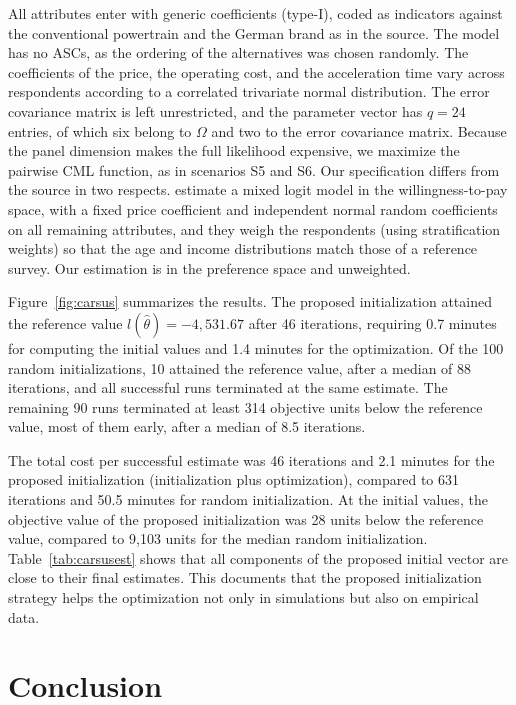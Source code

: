 \documentclass[preprint,12pt,authoryear]{elsarticle}
\begin{document}
All attributes enter with generic coefficients (type-I), coded as indicators against the conventional powertrain and the German brand as in the source. The model has no ASCs, as the ordering of the alternatives was chosen randomly. The coefficients of the price, the operating cost, and the acceleration time vary across respondents according to a correlated trivariate normal distribution. The error covariance matrix is left unrestricted, and the parameter vector has $q = 24$ entries, of which six belong to $\Omega$ and two to the error covariance matrix. Because the panel dimension makes the full likelihood expensive, we maximize the pairwise CML function, as in scenarios S5 and S6. Our specification differs from the source in two respects. \citet{Helveston2015} estimate a mixed logit model in the willingness-to-pay space, with a fixed price coefficient and independent normal random coefficients on all remaining attributes, and they weigh the respondents (using stratification weights) so that the age and income distributions match those of a reference survey. Our estimation is in the preference space and unweighted.

Figure~\ref{fig:carsus} summarizes the results. The proposed initialization attained the reference value $l(\hat{\theta}) = -4{,}531.67$ after 46 iterations, requiring 0.7 minutes for computing the initial values and 1.4 minutes for the optimization. Of the 100 random initializations, 10 attained the reference value, after a median of 88 iterations, and all successful runs terminated at the same estimate. The remaining 90 runs terminated at least 314 objective units below the reference value, most of them early, after a median of 8.5 iterations.

The total cost per successful estimate was 46 iterations and 2.1 minutes for the proposed initialization (initialization plus optimization), compared to 631 iterations and 50.5 minutes for random initialization. At the initial values, the objective value of the proposed initialization was 28 units below the reference value, compared to 9{,}103 units for the median random initialization. Table~\ref{tab:carsusest} shows that all components of the proposed initial vector are close to their final estimates. This documents that the proposed initialization strategy helps the optimization not only in simulations but also on empirical data.

\section{Conclusion}\label{sec:conclusion}
\end{document}
